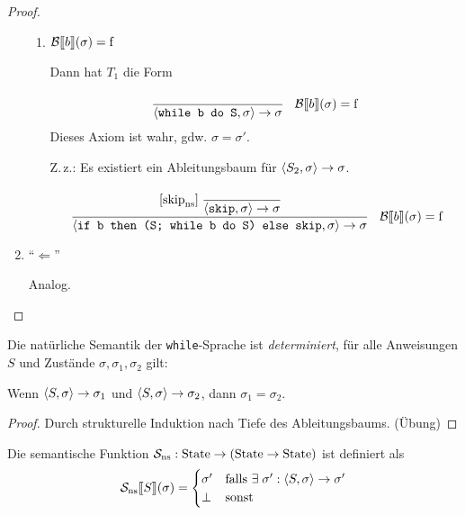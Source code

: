 \begin{proof}
\begin{enumerate}
\begin{enumerate}
                \item $\mathcal{B}\mathrm{[}\kern-.14em\mathrm{[} b\mathrm{]}\kern-.14em\mathrm{]}(\sigma) = \operatorname{f}$

                    Dann hat $T_1$ die Form
                    \begin{align*}
                        [\text{while}_{\text{ns}}^{\false}]
                        \cfrac{}{
                            \strans{\texttt{while b do S}}{\sigma}{\sigma}
                        }
                        \quad
                        \Bsem{b}(\sigma) = \false
                    \end{align*}
                    Dieses Axiom ist wahr, gdw. $\sigma = \sigma'$.

                    Z.\,z.: Es existiert ein Ableitungsbaum für $\langle S_2, \sigma \rangle \to \sigma$.
                    \begin{align*}
                        [\text{if}_{\text{ns}}^{\false}]\;
                        \cfrac{
                            [\text{skip}_{\text{ns}}]\;
                            \cfrac{}{\strans{\texttt{skip}}{\sigma}{\sigma}}
                        }{
                            \strans{\texttt{if b then (S; while b do S) else skip}}{\sigma}{\sigma}
                        }
                        \quad
                        \Bsem{b}(\sigma) = \false
                    \end{align*}
            \end{enumerate}

        \item ``$\Leftarrow$''

            Analog.
    \end{enumerate}
\end{proof}

\begin{remark}
    Die natürliche Semantik der \texttt{while}-Sprache ist \emph{determiniert}, \dh für alle Anweisungen $S$ und Zustände $\sigma, \sigma_1, \sigma_2$ gilt:

    Wenn $\langle S, \sigma \rangle \to \sigma_1$ und $\langle S, \sigma \rangle \to \sigma_2$, dann $\sigma_1 = \sigma_2$.
\end{remark}
\begin{proof}
    Durch strukturelle Induktion nach Tiefe des Ableitungsbaums. (Übung)
\end{proof}


\begin{definition}
    Die semantische Funktion $\mathcal{S}_{\text{ns}}: \operatorname{State} \to (\operatorname{State} \to \operatorname{State})$ ist definiert als
    \begin{align*}
        \mathcal{S}_{\text{ns}}\mathrm{[}\kern-.14em\mathrm{[} S \mathrm{]}\kern-.14em\mathrm{]}(\sigma) = \begin{cases}
            \sigma' & \text{falls } \exists\; \sigma': \langle S, \sigma \rangle \to \sigma' \\
            \bot & \text{sonst}
        \end{cases}
    \end{align*}
\end{definition}